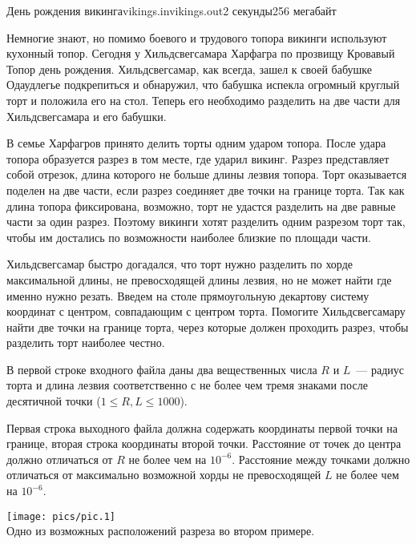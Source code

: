 \begin{problem}{День рождения викинга}{vikings.in}{vikings.out}{2 секунды}{256 мегабайт}


Немногие знают, но помимо боевого и трудового топора викинги используют кухонный топор. Сегодня у Хильдсвегсамара Харфагра по прозвищу 
Кровавый Топор день рождения. Хильдсвегсамар, как всегда, зашел к своей бабушке Одаудлегье подкрепиться и обнаружил, что бабушка испекла
огромный круглый торт и положила его на стол. Теперь его необходимо разделить на две  части для Хильдсвегсамара и его бабушки. 

В семье Харфагров принято делить торты одним ударом топора. После удара топора образуется разрез в том месте, где ударил викинг.
Разрез представляет собой отрезок, длина которого не больше длины лезвия топора. 
Торт оказывается поделен на две части, если разрез соединяет две точки на границе торта. Так как
длина топора фиксирована, возможно, торт не удастся разделить на две равные части за один разрез. 
Поэтому викинги хотят разделить одним разрезом торт так, чтобы им достались по возможности наиболее 
близкие по площади части. 

Хильдсвегсамар быстро догадался, что торт нужно разделить по хорде максимальной длины, не превосходящей длины лезвия, но не может найти где 
именно нужно резать. Введем на столе прямоугольную декартову систему координат с центром, совпадающим с центром торта. 
Помогите Хильдсвегсамару найти две точки на границе торта, через которые должен проходить разрез, чтобы  разделить торт наиболее честно.

\InputFile
В первой строке входного файла даны два вещественных числа $R$ и $L$~--- радиус торта и длина лезвия соответственно с не более чем тремя
знаками после десятичной точки ($1 \le R, L \le 1000$).

\OutputFile
Первая строка выходного файла должна содержать координаты первой точки на границе, вторая строка координаты второй точки. Расстояние от 
точек до центра должно отличаться от $R$ не более чем на $10^{-6}$. Расстояние между точками должно отличаться от максимально возможной
хорды не превосходящей $L$ не более чем на $10^{-6}$.

\Examples

\begin{example}%
%
%
\end{example}

\begin{center}
	\texttt{[image: pics/pic.1]}\\
	Одно из возможных расположений разреза во втором примере.
\end{center}



\end{problem}
